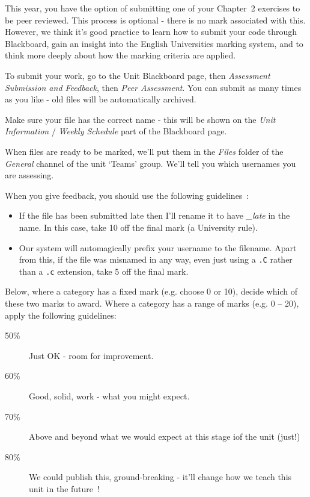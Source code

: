 
This year, you have the option of submitting one of your Chapter~2
exercises to be peer reviewed.  This process is optional - there is
no mark associated with this. However, we think it's good practice to
learn how to submit your code through Blackboard, gain an insight into
the English Universities marking system, and to think more deeply about
how the marking criteria are applied.

To submit your work, go to the Unit Blackboard page, then \emph{Assessment
Submission and Feedback}, then \emph{Peer Assessment}. You can submit
as many times as you like - old files will be automatically archived.

Make sure your file has the correct name - this will be shown on the
\emph{Unit Information} / \emph{Weekly Schedule} part of the Blackboard
page.


When files are ready to be marked, we'll put them in the {\emph{Files}}
folder of the \emph{General} channel of the unit `Teams' group. We'll
tell you which usernames you are assessing.

When you give feedback, you should use the following guidelines~:

\begin{itemize}
\item If the file has been submitted late then I'll rename it to have {\emph{\_late}} in the name. In this case, take 10 off the final mark (a University rule).
\item Our system will automagically prefix your username to the filename. Apart from this, if the file was misnamed in any way, even just using a \verb^.C^ rather than a \verb^.c^ extension, take 5 off the final mark.
\end{itemize}

\noindent Below, where a category has a fixed mark (e.g. choose 0 or 10), decide which of these two marks to award.
Where a category has a range of marks (e.g. 0 – 20), apply the following guidelines:
\begin{description}
\item[50\%] Just OK - room for improvement.
\item[60\%] Good, solid, work - what you might expect.
\item[70\%] Above and beyond what we would expect at this stage iof the unit (just!)
\item[80\%] We could publish this, ground-breaking - it'll change how we teach this unit in the future~!
\end{description}

